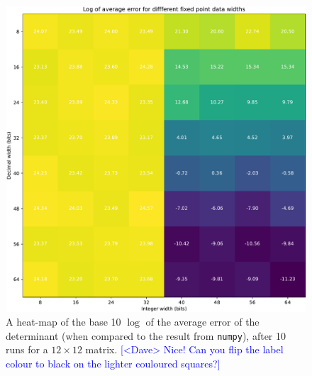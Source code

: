 \documentclass[12pt]{article}
\newcommand{\note}[2][red]{\textcolor{#1}{#2}}
\newcommand{\notedme}[1]{\note[blue]{[<Dave> #1]}}
\begin{document}
\begin{figure}[thp]
	\centering
	
	\includegraphics[width=\textwidth]{heatmap_full.pdf}
	
	\caption{A heat-map of the base 10 $\log$ of the average error of the determinant (when compared to the result from \lstinline|numpy|), after 10 runs for a $12 \times 12$ matrix. \notedme{Nice! Can you flip the label colour to black on the lighter couloured squares?}}
	\label{full_heat}
\end{figure}
\end{document}
